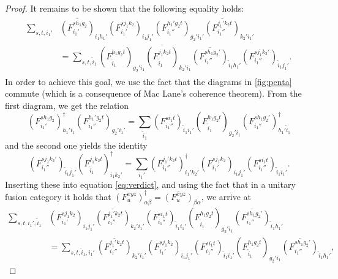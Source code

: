 \begin{proof}
	It remains to be shown that the following equality holds: 
		\begin{align}
			\begin{split}
			\sum_{s,t,i_1'}&\overline{\left(F_{i_1'}^{s h_1 g_2}\right)}_{i_1h_1'} \left(F_{i_1'}^{s j_1 k_2}\right)_{i_1j_1'}\left(F_{i_1''}^{h_1' g_2 t}\right)_{g_2'i_1'}\overline{\left(F_{i_1''}^{j_1'k_2t}\right)}_{k_2'i_1'}\\
			&=\sum_{s,t,\tilde{i}_1}\left(F_{\tilde{i}_1}^{h_1 g_2 t}\right)_{g_2'i_1}\overline{\left(F_{\tilde{i}_1}^{j_1k_2t}\right)}_{k_2'i_1}\overline{\left(F_{i_1''}^{s h_1 g_2'}\right)}_{\tilde{i}_1h_1'} \left(F_{i_1''}^{s j_1 k_2'}\right)_{\tilde{i}_1j_1'}.
			\label{eq:verdict}
			\end{split}
		\end{align}
	In order to achieve this goal, we use the fact that the diagrams in \cref{fig:penta} commute (which is a consequence of Mac Lane's coherence theorem). From the first diagram, we get the relation
		\begin{equation}
			\left(F_{i_1'}^{s h_1 g_2}\right)^\dagger_{h_1'i_1}\left(F_{i_1''}^{h_1' g_2 t}\right)_{g_2'i_1'}=\sum_{\tilde{i}_1}\left(F_{i_1''}^{si_1 t}\right)_{\tilde{i}_1i_1'} \left(F_{\tilde{i}_1}^{h_1g_2t}\right)_{g_2'i_1}\left(F_{i_1''}^{sh_1g_2'}\right)^\dagger_{h_1'\tilde{i}_1}
		\end{equation}
	and the second one yields the identity
		\begin{equation}
			\left(F_{i_1''}^{sj_1k_2'}\right)_{\tilde{i}_1j_1'}\left(F_{\tilde{i}_1}^{j_1k_2t}\right)^\dagger_{i_1k_2'}=\sum_{i_1'} \left(F_{i_1''}^{j_1'k_2t}\right)^\dagger_{i_1'k_2'}\left(F_{i_1'}^{sj_1k_2}\right)_{i_1j_1'}\left(F_{i_1''}^{si_1t}\right)_{\tilde{i}_1i_1'}.
		\end{equation}
	Inserting these into equation \cref{eq:verdict}, and using the fact that in a unitary fusion category it holds that $\left(F_u^{xyz}\right)^\dagger_{\alpha\beta}=\overline{\left(F_u^{xyz}\right)}_{\beta\alpha}$, we arrive at 
		\begin{align}
			\sum_{s,t,i_1',\tilde{i}_1}&\left(F_{i_1'}^{s j_1 k_2}\right)_{i_1j_1'}\overline{\left(F_{i_1''}^{j_1'k_2t}\right)}_{k_2'i_1'}\left(F_{i_1''}^{si_1 t}\right)_{\tilde{i}_1i_1'} \left(F_{\tilde{i}_1}^{h_1g_2t}\right)_{g_2'i_1}\overline{\left(F_{i_1''}^{sh_1g_2'}\right)}_{\tilde{i}_1h_1'}\\
			&=\sum_{s,t,\tilde{i}_1,i_1'}\overline{\left(F_{i_1''}^{j_1'k_2t}\right)}_{k_2'i_1'}\left(F_{i_1'}^{sj_1k_2}\right)_{i_1j_1'}\left(F_{i_1''}^{si_1t}\right)_{\tilde{i}_1 i_1'}\left(F_{\tilde{i}_1}^{h_1 g_2 t}\right)_{g_2'i_1}\overline{\left(F_{i_1''}^{s h_1 g_2'}\right)}_{\tilde{i}_1 h_1'},

\end{align}
\end{proof}
